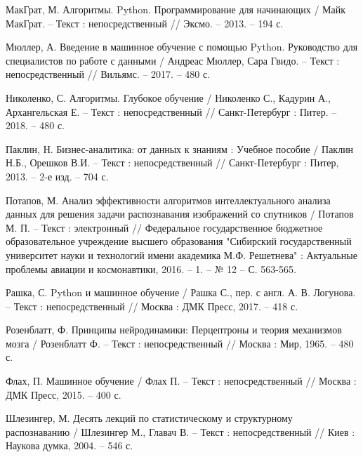 \begin{thebibliography}{3}
	 МакГрат, М. Алгоритмы. Python. Программирование для начинающих / Майк МакГрат. -- Текст : непосредственный // Эксмо. -- 2013. -- 194 с.							
	
	 Мюллер, А. Введение в машинное обучение с помощью Python. Руководство для специалистов по работе с данными / Андреас Мюллер, Сара Гвидо. -- Текст : непосредственный // Вильямс. -- 2017. -- 480 с.				
	
	 Николенко, С. Алгоритмы. Глубокое обучение / Николенко С., Кадурин А., Архангельская Е. -- Текст : непосредственный // Санкт-Петербург : Питер. -- 2018. -- 480 с.
	
	 Паклин, Н. Бизнес-аналитика: от данных к знаниям : Учебное пособие / Паклин Н.Б., Орешков В.И. -- Текст : непосредственный // Санкт-Петербург : Питер, 2013. -- 2-е изд. -- 704 с.
	
	 Потапов, М. Анализ эффективности алгоритмов интеллектуального анализа данных для решения задачи распознавания изображений со спутников / Потапов М. П. -- Текст : электронный // Федеральное государственное бюджетное образовательное учреждение высшего образования "Сибирский государственный университет науки и технологий имени академика М.Ф. Решетнева" : Актуальные проблемы авиации и космонавтики, 2016. -- 1. -- № 12 -- С. 563-565.	
	
	 Рашка, С. Python и машинное обучение / Рашка С., пер. с англ. А. В. Логунова. -- Текст : непосредственный // Москва : ДМК Пресс, 2017. -- 418 с.		
	
	 Розенблатт, Ф. Принципы нейродинамики: Перцептроны и теория механизмов мозга / Розенблатт Ф. -- Текст : непосредственный // Москва : Мир, 1965. -- 480 с.	
	
	 Флах, П. Машинное обучение / Флах П. -- Текст : непосредственный // Москва : ДМК Пресс, 2015. -- 400 с.
	
	 Шлезингер, М. Десять лекций по статистическому и структурному распознаванию / Шлезингер М., Главач В. -- Текст : непосредственный // Киев : Наукова думка, 2004. -- 546 с.
	
\end{thebibliography}